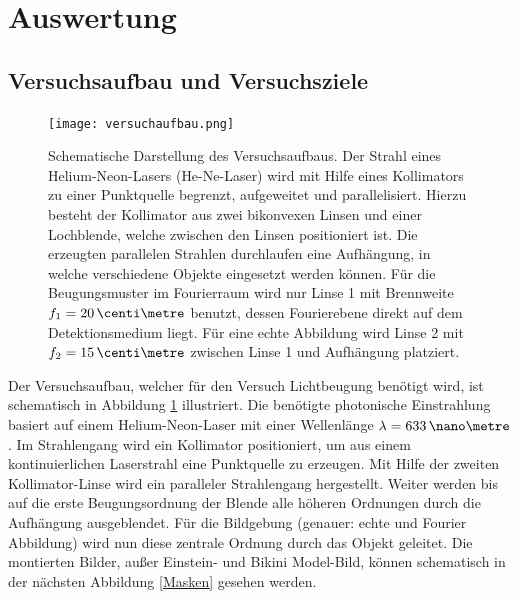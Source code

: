 





\section{Auswertung}

\subsection{Versuchsaufbau und Versuchsziele}

\begin{figure}[h]
\centering
\texttt{[image: versuchaufbau.png]}
\caption[Versuchsaufbau]{Schematische Darstellung des Versuchsaufbaus. Der Strahl eines Helium-Neon-Lasers (\textsf{He-Ne}-Laser) wird mit Hilfe eines Kollimators zu einer Punktquelle begrenzt, aufgeweitet und parallelisiert. Hierzu besteht der Kollimator aus zwei bikonvexen Linsen und einer Lochblende, welche zwischen den Linsen positioniert ist. Die erzeugten parallelen Strahlen durchlaufen eine Aufhängung, in welche verschiedene Objekte eingesetzt werden können. Für die Beugungsmuster im Fourierraum wird nur Linse 1 mit Brennweite $f_1=20\,\centi\metre$ benutzt, dessen Fourierebene direkt auf dem Detektionsmedium liegt. Für eine echte Abbildung wird Linse 2 mit $f_2=15\,\centi\metre$ zwischen Linse 1 und Aufhängung platziert.}
\label{aufbau}
\end{figure}

Der Versuchsaufbau, welcher für den Versuch Lichtbeugung benötigt wird, ist schematisch in Abbildung \ref{aufbau} illustriert. Die benötigte photonische Einstrahlung basiert auf einem Helium-Neon-Laser mit einer Wellenlänge $\lambda=633\,\nano\metre$. Im Strahlengang wird ein Kollimator positioniert, um aus einem kontinuierlichen Laserstrahl eine Punktquelle zu erzeugen. Mit Hilfe der zweiten Kollimator-Linse wird ein paralleler Strahlengang hergestellt. Weiter werden bis auf die erste Beugungsordnung der Blende alle höheren Ordnungen durch die Aufhängung ausgeblendet. Für die Bildgebung (genauer: echte und Fourier Abbildung) wird nun diese zentrale Ordnung durch das Objekt geleitet. Die montierten Bilder, außer Einstein- und Bikini Model-Bild, können schematisch in der nächsten Abbildung \ref{Masken} gesehen werden.

